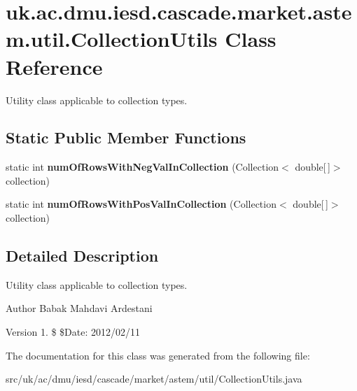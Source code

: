 \hypertarget{classuk_1_1ac_1_1dmu_1_1iesd_1_1cascade_1_1market_1_1astem_1_1util_1_1_collection_utils}{\section{uk.\-ac.\-dmu.\-iesd.\-cascade.\-market.\-astem.\-util.\-Collection\-Utils Class Reference}
\label{classuk_1_1ac_1_1dmu_1_1iesd_1_1cascade_1_1market_1_1astem_1_1util_1_1_collection_utils}
}


Utility class applicable to collection types.  


\subsection*{Static Public Member Functions}
\begin{DoxyCompactItemize}
\item 
\hypertarget{classuk_1_1ac_1_1dmu_1_1iesd_1_1cascade_1_1market_1_1astem_1_1util_1_1_collection_utils_ac7ee5ab697ba4c12825482d9b45e5897}{static int {\bfseries num\-Of\-Rows\-With\-Neg\-Val\-In\-Collection} (Collection$<$ double\mbox{[}$\,$\mbox{]}$>$ collection)}\label{classuk_1_1ac_1_1dmu_1_1iesd_1_1cascade_1_1market_1_1astem_1_1util_1_1_collection_utils_ac7ee5ab697ba4c12825482d9b45e5897}

\item 
\hypertarget{classuk_1_1ac_1_1dmu_1_1iesd_1_1cascade_1_1market_1_1astem_1_1util_1_1_collection_utils_a1e96bbeb76c7c733764beb7ac7aeb114}{static int {\bfseries num\-Of\-Rows\-With\-Pos\-Val\-In\-Collection} (Collection$<$ double\mbox{[}$\,$\mbox{]}$>$ collection)}\label{classuk_1_1ac_1_1dmu_1_1iesd_1_1cascade_1_1market_1_1astem_1_1util_1_1_collection_utils_a1e96bbeb76c7c733764beb7ac7aeb114}

\end{DoxyCompactItemize}


\subsection{Detailed Description}
Utility class applicable to collection types. 

\begin{DoxyAuthor}{Author}
Babak Mahdavi Ardestani 
\end{DoxyAuthor}
\begin{DoxyVersion}{Version}
1. \$ \$\-Date\-: 2012/02/11 
\end{DoxyVersion}


The documentation for this class was generated from the following file\-:\begin{DoxyCompactItemize}
\item 
src/uk/ac/dmu/iesd/cascade/market/astem/util/Collection\-Utils.\-java\end{DoxyCompactItemize}
